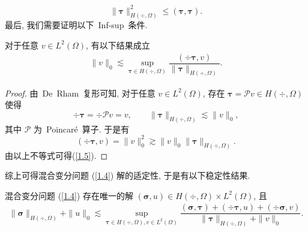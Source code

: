 	$$\|\boldsymbol\tau\|^2_{H(\div, \Omega)}\leq(\boldsymbol\tau, \boldsymbol\tau).$$ 
	最后, 我们需要证明以下~Inf-sup~条件.
	\begin{lemma}
		对于任意 $v\in L^2(\Omega)$, 有以下结果成立
		\begin{align}
			\label{1.5}
			\|v\|_0\lesssim\sup_{\boldsymbol\tau\in H(\div,\Omega)}\dfrac{(\div\boldsymbol\tau, v)}{\|\boldsymbol\tau\|_{H(\div, \Omega)}}.
		\end{align}
	\end{lemma}
	\begin{proof}
		由~De~Rham~复形可知, 对于任意 $v\in L^2(\Omega)$, 存在 $\boldsymbol\tau=\mathcal P v\in H(\div,\Omega)$ 使得
		$$\div\boldsymbol\tau=\div\mathcal P v=v, \qquad \|\boldsymbol\tau\|_{H(\div,\Omega)}\lesssim\|v\|_0,$$
		其中 $\mathcal P$ 为~Poincar\'{e}~算子. 于是有
		$$(\div\boldsymbol\tau, v)=\|v\|^2_0\gtrsim \|v\|_0\|\boldsymbol\tau\|_{H(\div,\Omega)}.$$
		由以上不等式可得(\ref{1.5}).
	\end{proof}
	
	综上可得混合变分问题 (\ref{1.4}) 解的适定性, 于是有以下稳定性结果.
	\begin{theorem}
		混合变分问题 (\ref{1.4}) 存在唯一的解 $(\boldsymbol\sigma, u)\in H(\div,\Omega)\times L^2(\Omega)$, 且
		\begin{align}
			\label{1.6}
			\|\boldsymbol\sigma\|_{H(\div,\Omega)}+\|u\|_0\lesssim\sup_{\boldsymbol\tau\in H(\div,\Omega), v\in L^2(\Omega)}\dfrac{(\boldsymbol\sigma, \boldsymbol\tau)+(\div\boldsymbol\tau, u)+(\div\boldsymbol\sigma, v)}{\|\boldsymbol\tau\|_{H(\div,\Omega)}+\|v\|_0}.
		\end{align}
	\end{theorem}
	
	
